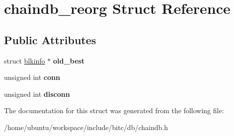 \hypertarget{structchaindb__reorg}{\section{chaindb\-\_\-reorg Struct Reference}
\label{structchaindb__reorg}
}
\subsection*{Public Attributes}
\begin{DoxyCompactItemize}
\item 
\hypertarget{structchaindb__reorg_a5d998538ae037105e673d94796a109be}{struct \hyperlink{structblkinfo}{blkinfo} $\ast$ {\bfseries old\-\_\-best}}\label{structchaindb__reorg_a5d998538ae037105e673d94796a109be}

\item 
\hypertarget{structchaindb__reorg_a226948a63bc76d66cc48be964a1f2dc6}{unsigned int {\bfseries conn}}\label{structchaindb__reorg_a226948a63bc76d66cc48be964a1f2dc6}

\item 
\hypertarget{structchaindb__reorg_a37549ca2aae4f427f06d8ff4fe0fe7d3}{unsigned int {\bfseries disconn}}\label{structchaindb__reorg_a37549ca2aae4f427f06d8ff4fe0fe7d3}

\end{DoxyCompactItemize}


The documentation for this struct was generated from the following file\-:\begin{DoxyCompactItemize}
\item 
/home/ubuntu/workspace/include/bitc/db/chaindb.\-h\end{DoxyCompactItemize}
